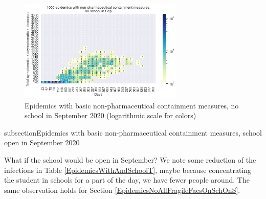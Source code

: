 \documentclass[graybox]{svmult}
\begin{document}
\begin{figure}[t]
\begin{center}
\includegraphics[width=0.7\textwidth]{HM30_readRunResults1k_withControl_plusHMlog.png}
\caption{Epidemics with basic non-pharmaceutical containment measures, no school in September 2020 (logarithmic scale for colors)}
\label{EpidemicsWithAndNoSchoolHM}
\end{center}
\end{figure}


subsection{Epidemics with basic non-pharmaceutical containment measures, school open in September 2020}
\label{EpidemicsWithAndSchoolS}


What if the school would be open in September? We note some reduction of the infections in Table \ref{EpidemicsWithAndSchoolT}, maybe because concentrating the student in schools for a part of the day, we have fewer people around. The same observation holds for Section \ref{EpidemicsNoAllFragileFacsOnSchOnS}.
\end{document}
